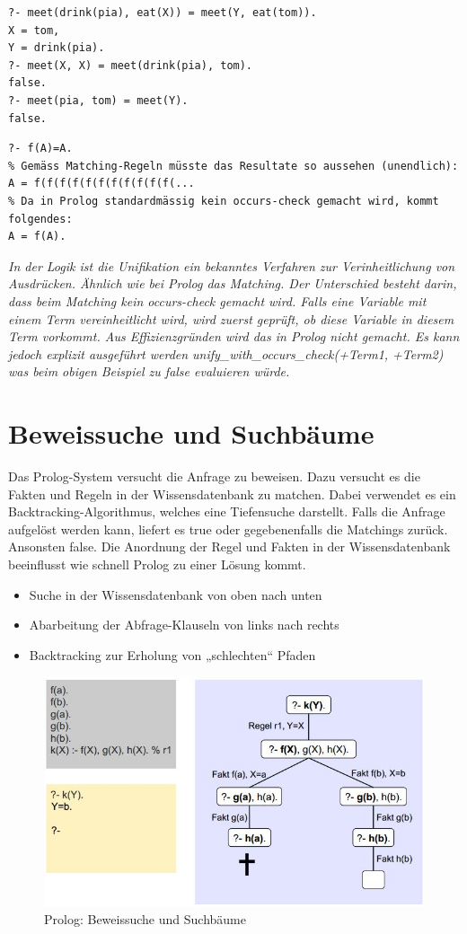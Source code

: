 \begin{lstlisting}[caption=Gleichheits-Prädikat auf zusammengesetzten Termen]
% Matchen wenn gleicher Funktor, gleiche Stelligkeit und alle korrespondierende Argumente matchen.
?- meet(drink(pia), eat(X)) = meet(Y, eat(tom)).
X = tom,
Y = drink(pia).
?- meet(X, X) = meet(drink(pia), tom).
false.
?- meet(pia, tom) = meet(Y).
false.
\end{lstlisting}

\begin{lstlisting}[caption=Unendliche Terme]
% Was passiert da?
?- f(A)=A.
% Gemäss Matching-Regeln müsste das Resultate so aussehen (unendlich):
A = f(f(f(f(f(f(f(f(f(f(f(...
% Da in Prolog standardmässig kein occurs-check gemacht wird, kommt folgendes:
A = f(A).
\end{lstlisting}

\emph{In der Logik ist die Unifikation ein bekanntes Verfahren zur Verinheitlichung von Ausdrücken. Ähnlich wie bei Prolog das Matching. Der Unterschied besteht darin, dass beim Matching kein occurs-check gemacht wird. Falls eine Variable mit einem Term vereinheitlicht wird, wird zuerst geprüft, ob diese Variable in diesem Term vorkommt. Aus Effizienzgründen wird das in Prolog nicht gemacht. Es kann jedoch explizit ausgeführt werden unify\_with\_occurs\_check(+Term1, +Term2) was beim obigen Beispiel zu false evaluieren würde.}

\section{Beweissuche und Suchbäume}
Das Prolog-System versucht die Anfrage zu beweisen. Dazu versucht es die Fakten und Regeln in der Wissensdatenbank zu matchen. Dabei verwendet es ein Backtracking-Algorithmus, welches eine Tiefensuche darstellt. Falls die Anfrage aufgelöst werden kann, liefert es true oder gegebenenfalls die Matchings zurück. Ansonsten false. Die Anordnung der Regel und Fakten in der Wissensdatenbank beeinflusst wie schnell Prolog zu einer Lösung kommt.

\begin{itemize}
	\item Suche in der Wissensdatenbank von oben nach unten
	\item Abarbeitung der Abfrage-Klauseln von links nach rechts
	\item Backtracking zur Erholung von „schlechten“ Pfaden
\end{itemize}

\begin{figure}[h!]
\centering
\includegraphics[width=0.47\linewidth]{fig/prolog-beweissuche-suchbaueme}
\caption{Prolog: Beweissuche und Suchbäume}
\label{fig:prolog-beweissuche-suchbaueme}
\end{figure}

